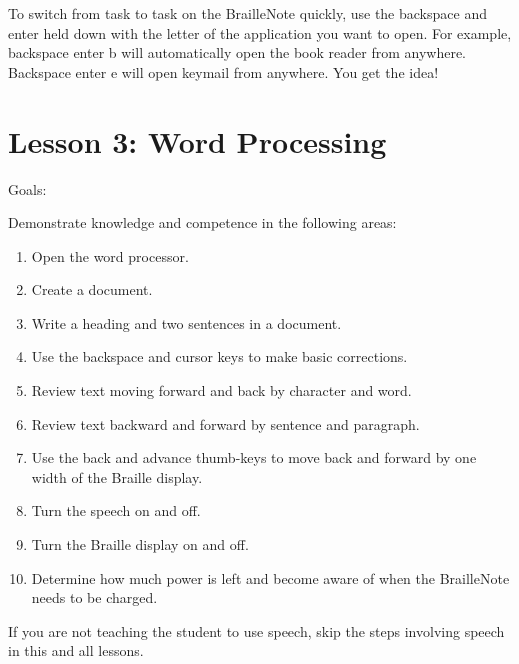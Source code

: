 \documentclass[10pt,letterpaper,twoside]{report}
\begin{document}
{{{{To switch from task to task on the BrailleNote quickly, use the backspace and enter held down with the letter of the application you want to open.  For example, backspace enter b will automatically open the book reader from anywhere.  Backspace enter e will open keymail from anywhere.  You get the idea!

\section*{Lesson 3: Word Processing}


Goals:



Demonstrate knowledge and competence in the following areas:



\begin{enumerate}
	\item Open the word processor.
	      
	\item Create a document.
	      
	\item Write a heading and two sentences in a document.
	      
	\item Use the backspace and cursor keys to make basic corrections.
	      
	\item Review text moving forward and back by character and word.
	      
	\item Review text backward and forward by sentence and paragraph.
	      
	\item Use the back and advance thumb-keys to move back and forward by one width of the Braille display.
	      
	\item Turn the speech on and off.
	      
	\item Turn the Braille display on and off.
	      
	\item Determine how much power is left and become aware of when the BrailleNote needs to be charged.
\end{enumerate}



If you are not teaching the student to use speech, skip the steps involving speech in this and all lessons.



}}}}
\end{document}

